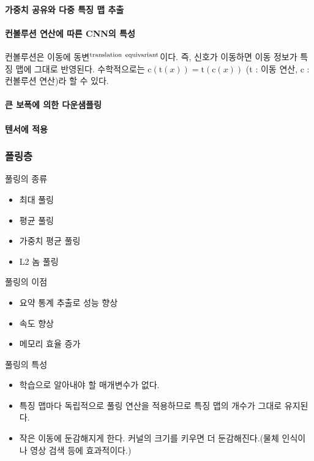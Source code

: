 \documentclass [12pt] {oblivoir}
\let\oldsubsubsection=\subsubsection
\renewcommand{\subsubsection}
{
  \filbreak
  \oldsubsubsection
}
\begin{document}
\paragraph*{가중치 공유와 다중 특징 맵 추출}\mbox{}

\vspace{3mm}

\paragraph*{컨볼루션 연산에 따른 CNN의 특성}\mbox{}

\vspace{3mm}

컨볼루션은 이동에 동변$^{\text{translation\, equivariant}}$이다. 즉, 신호가 이동하면 이동 정보가 특징 맵에 그대로 반영된다. 수학적으로는 $\text{c}(\text{t}(x)) = \text{t}(\text{c}(x))$ (t : 이동 연산, c : 컨볼루션 연산)라 할 수 있다.

\paragraph*{큰 보폭에 의한 다운샘플링}\mbox{}

\vspace{3mm}

\paragraph*{텐서에 적용}\mbox{}

\vspace{3mm}

\subsubsection{폴링층}
풀링의 종류
\begin{itemize}
  \item 최대 풀링
  \item 평균 풀링
  \item 가중치 평균 풀링
  \item L2 놈 풀링
\end{itemize}

풀링의 이점
\begin{itemize}
  \item 요약 통계 추출로 성능 향상
  \item 속도 향상
  \item 메모리 효율 증가
\end{itemize}

풀링의 특성
\begin{itemize}
  \item 학습으로 알아내야 할 매개변수가 없다.
  \item 특징 맵마다 독립적으로 풀링 연산을 적용하므로 특징 맵의 개수가 그대로 유지된다.
  \item 작은 이동에 둔감해지게 한다. 커널의 크기를 키우면 더 둔감해진다.(물체 인식이나 영상 검색 등에 효과적이다.)
\end{itemize}
\end{document}
